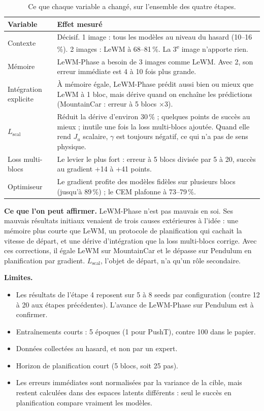 \documentclass[11pt,a4paper]{article}
\newcommand{\Lscal}{L_{\mathrm{scal}}}
\begin{document}
\begin{table}[htbp]
\centering\small
\begin{tabular}{@{}lp{12.3cm}@{}}
\toprule
Variable & Effet mesuré \\
\midrule
Contexte & Décisif. 1 image : tous les modèles au niveau du hasard (10--16\,\%). 2 images :
LeWM à 68--81\,\%. La 3\textsuperscript{e} image n'apporte rien. \\
Mémoire & LeWM-Phase a besoin de 3 images comme LeWM. Avec 2, son erreur immédiate est 4 à
10 fois plus grande. \\
Intégration explicite & À mémoire égale, LeWM-Phase prédit aussi bien ou mieux que LeWM à
1 bloc, mais dérive quand on enchaîne les prédictions (MountainCar : erreur à 5 blocs $\times 3$). \\
$\Lscal$ & Réduit la dérive d'environ 30\,\% ; quelques points de succès au mieux ; inutile
une fois la loss multi-blocs ajoutée. Quand elle rend $J_u$ scalaire, $\gamma$ est toujours
négatif, ce qui n'a pas de sens physique. \\
Loss multi-blocs & Le levier le plus fort : erreur à 5 blocs divisée par 5 à 20, succès au
gradient +14 à +41 points. \\
Optimiseur & Le gradient profite des modèles fidèles sur plusieurs blocs (jusqu'à 89\,\%) ;
le CEM plafonne à 73--79\,\%. \\
\bottomrule
\end{tabular}
\caption{Ce que chaque variable a changé, sur l'ensemble des quatre étapes.}
\end{table}

\textbf{Ce que l'on peut affirmer.} LeWM-Phase n'est pas mauvais en soi. Ses mauvais résultats
initiaux venaient de trois causes extérieures à l'idée : une mémoire plus courte que LeWM, un
protocole de planification qui cachait la vitesse de départ, et une dérive d'intégration que la
loss multi-blocs corrige. Avec ces corrections, il égale LeWM sur MountainCar et le dépasse
sur Pendulum en planification par gradient. $\Lscal$, l'objet de départ, n'a qu'un rôle
secondaire.

\textbf{Limites.}
\begin{itemize}
  \item Les résultats de l'étape 4 reposent sur 5 à 8 seeds par configuration (contre 12 à 20
  aux étapes précédentes). L'avance de LeWM-Phase sur Pendulum est à confirmer.
  \item Entraînements courts : 5 époques (1 pour PushT), contre 100 dans le papier.
  \item Données collectées au hasard, et non par un expert.
  \item Horizon de planification court (5 blocs, soit 25 pas).
  \item Les erreurs immédiates sont normalisées par la variance de la cible, mais restent
  calculées dans des espaces latents différents : seul le succès en planification compare
  vraiment les modèles.
\end{itemize}
\end{document}
